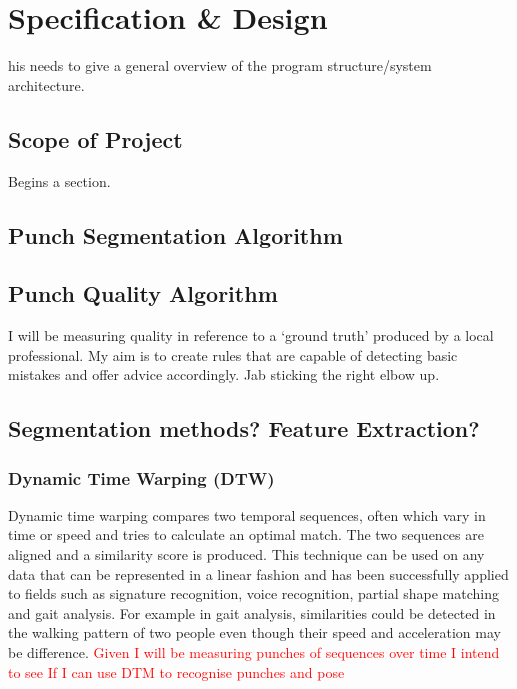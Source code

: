 %
%
\let\textcircled=\pgftextcircled
\chapter{Specification \& Design}
\label{chap:intro}

his needs to give a general overview of the program structure/system architecture.


\section{Scope of Project}
\label{sec:sec01}
Begins a section.

\section{Punch Segmentation Algorithm}

\section{Punch Quality Algorithm}
I will be measuring quality in reference to a `ground truth' produced by a local professional. My aim is to create rules that are capable of detecting basic mistakes and offer advice accordingly. 
Jab sticking the right elbow up.



\section{Segmentation methods? Feature Extraction?}


\subsection{Dynamic Time Warping (DTW)}
Dynamic time warping compares two temporal sequences, often which vary in time or speed and tries to calculate an optimal match. The two sequences are aligned and a similarity score is produced. This technique can be used on any data that can be represented in a linear fashion and has been successfully applied to fields such as signature recognition, voice recognition, partial shape matching and gait analysis. For example in gait analysis, similarities could be detected in the walking pattern of two people even though their speed and acceleration may be difference. 
\textcolor{red}{Given I will be measuring punches of sequences over time I intend to see If I can use DTM to recognise punches and pose}


